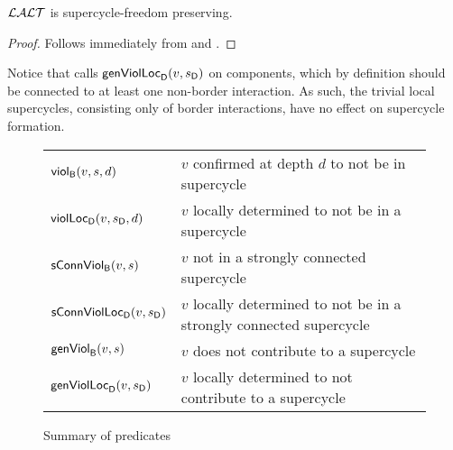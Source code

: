 \begin{theorem} \label{thm:LAO.SC-free-preserving}
$\LAO$ is supercycle-freedom preserving.
\end{theorem}
%
\begin{proof}
Follows immediately from  and .
\end{proof}
%
Notice that  calls $\locFormViol{v}{\sD}{\act}{\l}$ on components, which by definition should be connected to at least one non-border interaction. 
As such, the trivial local supercycles, \ie consisting only of border interactions, have no effect on supercycle formation. 

\begin{figure}[t]

\begin{tabular}{|l|l|}
\hline
$\scViol{v}{d}{s}$  & $v$ confirmed at depth $d$ to not be in supercycle\\ 
$\locScViol{v}{d}{\sD}{\act}{\l}$ & $v$ locally determined to not be in a supercycle\\

$\connViol{v}{s}$ & $v$ not in a strongly connected supercycle \\

$\locConnViol{v}{\sD}{\act}{\l}$ & $v$ locally determined to not be in a strongly connected supercycle \\

$\formViol{v}{s}$ & $v$ does not contribute to a supercycle\\

$\locFormViol{v}{\sD}{\act}{\l}$ & $v$ locally determined to not contribute to a supercycle\\

\hline
\end{tabular}

\caption{Summary of predicates}
\label{fig:summaryPredicates}
\end{figure}












